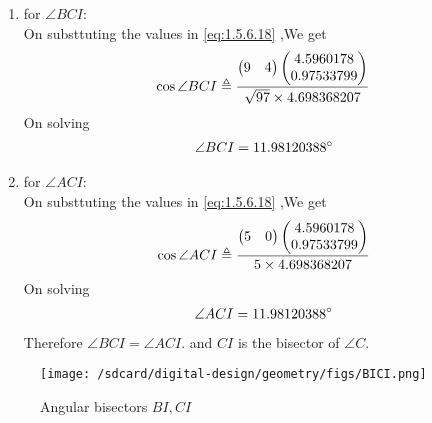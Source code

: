 \documentclass[11pt]{book}
\begin{document}
\begin{enumerate}[label=\thesection.\arabic*.,ref=\thesection.\theenumi]
\begin{enumerate}
\begin{enumerate}
    \item for $\angle BCI$: \\
    On substtuting the values in  \eqref{eq:1.5.6.18} ,We get 
    \begin{align}
        \cos{\angle BCI} \triangleq \frac{\begin{pmatrix} 9 & 4\end{pmatrix}\begin{pmatrix}4.5960178 \\ 0.97533799\end{pmatrix}}{ \sqrt{97}\times 4.698368207} \\
    \end{align}
    On solving 
    \begin{align}
        \angle BCI = 11.98120388 \degree
    \end{align}
       \item for $\angle ACI$: \\
    On substtuting the values in  \eqref{eq:1.5.6.18} ,We get 
    \begin{align}
        \cos{\angle ACI} \triangleq \frac{\begin{pmatrix} 5 & 0\end{pmatrix}\begin{pmatrix}4.5960178 \\ 0.97533799\end{pmatrix}}{ 5 \times 4.698368207} \\
    \end{align}
    On solving 
    \begin{align}
        \angle ACI = 11.98120388 \degree
    \end{align}
    Therefore $\angle BCI = \angle ACI.$ and $CI$ is the bisector of $\angle C$. 
\end{enumerate}
\begin{figure}[H]
\texttt{[image: /sdcard/digital-design/geometry/figs/BICI.png]}
\caption{Angular bisectors  $BI, CI$}
\label{fig:fig5}
\end{figure}
\end{enumerate}

\end{enumerate}
\end{document}
